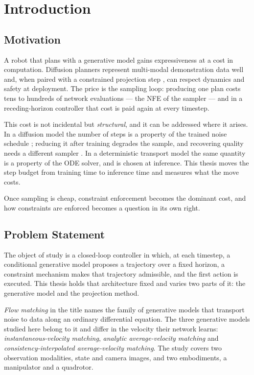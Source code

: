 \chapter{Introduction}\label{ch:introduction}

\section{Motivation}\label{sec:intro:motivation}

A robot that plans with a generative model gains expressiveness at a cost in computation. Diffusion
planners \parencite{janner2022planning,chi2023diffusion} represent multi-modal demonstration data
\parencite{jia2024towards} well and, when paired with a constrained projection step
\parencite{romer2025diffusion}, can respect dynamics and safety at deployment. The price is the sampling
loop: producing one plan costs tens to hundreds of network evaluations --- the \ac{NFE} of the
sampler --- and in a receding-horizon controller that cost is paid again at every timestep.

This cost is not incidental but \emph{structural}, and it can be addressed where it arises. In a
diffusion model the number of steps is a
property of the trained noise schedule \parencite{ho2020denoising}; reducing it after training
degrades the sample, and recovering quality needs a different sampler
\parencite{song2021denoising}. In a deterministic transport model \parencite{lipman2023flow} the same
quantity is a property of the \ac{ODE} solver, and is chosen at inference. This thesis moves the
step budget from training time to inference time and measures what the move costs.

Once sampling is cheap, constraint enforcement becomes the dominant cost, and how constraints are
enforced becomes a question in its own right.

\section{Problem Statement}\label{sec:intro:problem}

The object of study is a closed-loop controller in which, at each timestep, a conditional
generative model proposes a trajectory over a fixed horizon, a constraint mechanism makes
that trajectory admissible, and the first action is executed. This thesis holds that
architecture fixed and varies two parts of it: the generative model and the projection method.

\emph{Flow matching} in the title names the family of generative models that transport noise to data
along an ordinary differential equation. The three generative models studied here belong to it and
differ in the velocity their network learns: \emph{instantaneous-velocity matching},
\emph{analytic average-velocity matching} and \emph{consistency-interpolated average-velocity
matching}. The study covers two observation modalities, state and camera images, and two embodiments, a manipulator
and a quadrotor.

